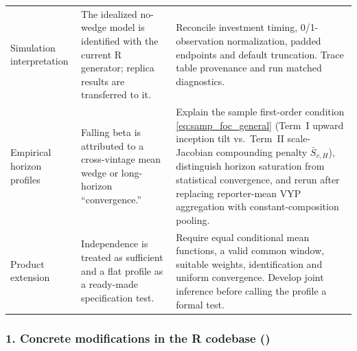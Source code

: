 \documentclass[11pt]{article}
\newcommand{\file}[1]{\path{#1}}
\theoremstyle{plain}
\theoremstyle{definition}
\begin{document}
{\begin{longtable}{@{}L{3.1cm}L{5.2cm}L{7.0cm}@{}}
Simulation interpretation & The idealized no-wedge model is identified with the current R generator; replica results are transferred to it. & Reconcile investment timing, 0/1-observation normalization, padded endpoints and default truncation. Trace table provenance and run matched diagnostics.\\
Empirical horizon profiles & Falling beta is attributed to a cross-vintage mean wedge or long-horizon ``convergence.'' & Explain the sample first-order condition \eqref{eq:samp_foc_general} (Term~I upward inception tilt vs.\ Term~II scale-Jacobian compounding penalty $\bar S_{v,H}$), distinguish horizon saturation from statistical convergence, and rerun after replacing reporter-mean VYP aggregation with constant-composition pooling.\\
Product extension & Independence is treated as sufficient and a flat profile as a ready-made specification test. & Require equal conditional mean functions, a valid common window, suitable weights, identification and uniform convergence. Develop joint inference before calling the profile a formal test.\\
\bottomrule
\end{longtable}
}

\subsubsection*{1. Concrete modifications in the R codebase (\file{r_project/})}
\end{document}
